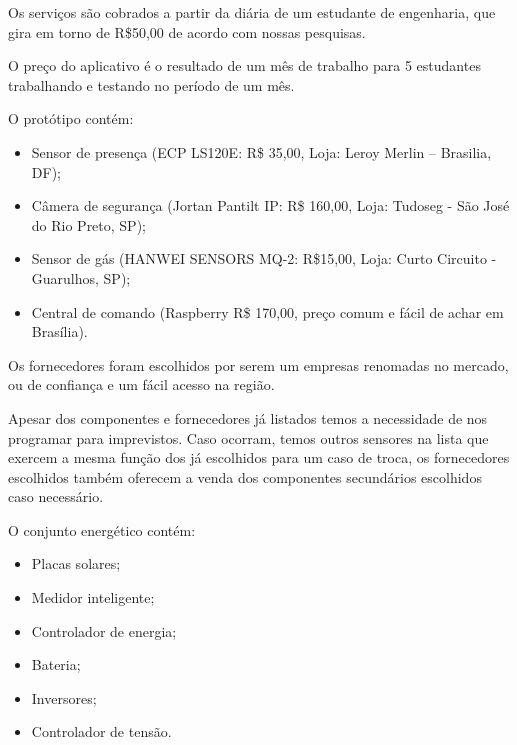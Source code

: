 \par Os serviços são cobrados a partir da diária de um estudante de engenharia, que gira em torno de R\$50,00 de acordo com nossas pesquisas.
\par O preço do aplicativo é o resultado de um mês de trabalho para 5 estudantes trabalhando e testando no período de um mês.
\par O protótipo contém:
\begin{itemize}
    \item Sensor de presença (ECP  LS120E: R\$ 35,00, Loja: Leroy Merlin \-– Brasilia, DF);
    \item Câmera de segurança (Jortan Pantilt  IP: R\$ 160,00, Loja: Tudoseg \-- São José do Rio Preto, SP);
    \item Sensor de gás (HANWEI SENSORS MQ-2: R\$15,00, Loja: Curto Circuito \-- Guarulhos, SP);
    \item Central de comando (Raspberry R\$ 170,00, preço comum e fácil de achar em Brasília).
\end{itemize}

\par Os fornecedores foram escolhidos por serem um empresas renomadas no mercado, ou de confiança e um fácil acesso na região.
\par Apesar dos componentes e fornecedores já listados temos a necessidade de nos programar para imprevistos. Caso ocorram, temos outros sensores na lista que exercem a mesma função dos já escolhidos para um caso de troca, os fornecedores escolhidos também oferecem a venda dos componentes secundários escolhidos caso necessário.
\par O conjunto energético contém:

\begin{itemize}
    \item Placas solares;
    \item Medidor inteligente;
    \item Controlador de energia;
    \item Bateria;
    \item Inversores;
    \item Controlador de tensão.
\end{itemize}
